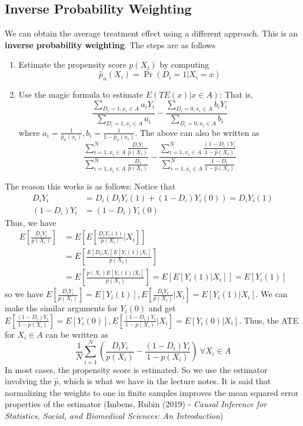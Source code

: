 \documentclass[12pt]{article}
\theoremstyle{definition}
\theoremstyle{property}
\theoremstyle{assumption}
\theoremstyle{example}
\theoremstyle{comment}
\begin{document}
\subsection{Inverse Probability Weighting}
We can obtain the average treatment effect using a different approach. This is an \textbf{inverse probability weighting}. The steps are as follows
\begin{enumerate}
\item Estimate the propensity score $p(X_i)$ by computing
\[
\hat{p}_n(X_i)=\Pr(D_i=1|X_i=x)
\]
\item Use the magic formula to estimate $E(TE(x)|x\in A)$: That is,
\[
\frac{\sum_{D_i=1,x_i\in A}a_iY_i}{\sum_{D_i=1,x_i\in A}a_i}- \frac{\sum_{D_i=0,x_i\in A}b_iY_i}{\sum_{D_i=0,x_i\in A}b_i}
\]
where $a_i=\frac{1}{\hat{p}_n(x_i)}, b_i=\frac{1}{1-\hat{p}_n(x_i)}$. The above can also be written as
\[
\frac{\sum_{i=1,x_i\in A}^N\frac{D_iY_i}{\hat{p}(X_i)}}{\sum_{i=1,x_i\in A}^N\frac{D_i}{\hat{p}(X_i)}}-\frac{\sum_{i=1,x_i\in A}^N\frac{(1-D_i)Y_i}{1-\hat{p}(X_i)}}{\sum_{i=1,x_i\in A}^N\frac{1-D_i}{1-\hat{p}(X_i)}}\]
\end{enumerate}\par
The reason this works is as follows: Notice that
\begin{align*}
D_iY_i& = D_i(D_iY_i(1)+(1-D_i)Y_i(0))=D_iY_i(1)\\
(1-D_i)Y_i&=(1-D_i)Y_i(0)
\end{align*}
Thus, we have
\begin{align*}
E\left[\frac{D_iY_i}{p(X_i)}\right]&=E\left[E\left[\frac{D_iY_i(1)}{p(X_i)}|X_i\right]\right]\\
&=E\left[\frac{E[D_i|X_i]E[Y_i(1)|X_i]}{p(X_i)}\right]\\
&=E\left[\frac{p(X_i)E[Y_i(1)|X_i]}{p(X_i)}\right]=E[E[Y_i(1)|X_i]]=E[Y_i(1)]
\end{align*}
so we have $E\left[\frac{D_iY_i}{p(X_i)}\right]=E[Y_i(1)], E\left[\frac{D_iY_i}{p(X_i)}|X_i\right]=E[Y_i(1)|X_i]$. We can make the similar arguments for $Y_i(0)$ and get $E\left[\frac{(1-D_i)Y_i}{1-p(X_i)}\right]=E[Y_i(0)], E\left[\frac{(1-D_i)Y_i}{1-p(X_i)}|X_i\right]=E[Y_i(0)|X_i]$. Thus, the ATE for $X_i\in A$ can be written as
\[
\frac{1}{N}\sum_{i=1}^N\left(\frac{D_i Y_i}{p(X_i)}-\frac{(1-D_i)Y_i}{1-p(X_i)}\right) \ \forall X_i\in A
\]
In most cases, the propensity score is estimated. So we use the estimator involving the $\hat{p}$, which is what we have in the lecture notes. It is said that normalizing the weights to one in finite samples improves the mean squared error properties of the estimator (Imbens, Rubin (2019) - \textit{Causal Inference for Statistics, Social, and Biomedical Sciences: An Introduction})
\end{document}
